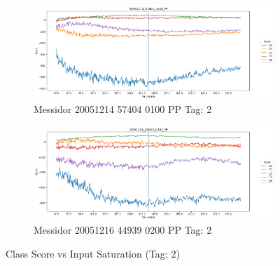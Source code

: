 \begin{figure}[ht!]
	\begin{subfigure}[b]{ 0.85\textwidth}
		\centering
		\includegraphics[width=\textwidth]{Figures/chapter_stability/20051214_57404_0100_PP/s/scores.png}
		\caption{Messidor 20051214 57404 0100 PP Tag: 2}		
	\end{subfigure}	
	\begin{subfigure}[b]{ 0.85\textwidth}
		\centering
		\includegraphics[width=\textwidth]{Figures/chapter_stability/20051216_44939_0200_PP/s/scores.png}
		\caption{Messidor 20051216 44939 0200 PP Tag: 2}		
	\end{subfigure}
	\hfill 
	\caption[Score vs Saturation (Tag: 2)]{Class Score vs Input Saturation (Tag: 2)}  
	\label{sta:fig:sat2} 
\end{figure}

